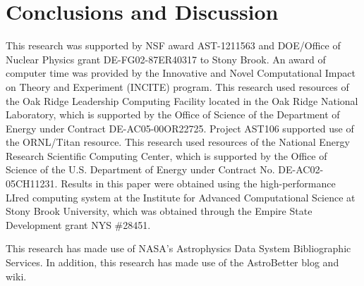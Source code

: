 \documentclass[twocolumn,numberedappendix]{../aastex6}
\begin{document}



\section{Conclusions and Discussion}\label{Sec:Conclusions and Discussion}
\label{sec:conclusion}



\acknowledgments

This research was supported by NSF award AST-1211563 and DOE/Office of
Nuclear Physics grant DE-FG02-87ER40317 to Stony Brook. An award of
computer time was provided by the Innovative and Novel Computational
Impact on Theory and Experiment (INCITE) program.  This research used
resources of the Oak Ridge Leadership Computing Facility located in
the Oak Ridge National Laboratory, which is supported by the Office of
Science of the Department of Energy under Contract
DE-AC05-00OR22725. Project AST106 supported use of the ORNL/Titan
resource.  This research used resources of the National Energy
Research Scientific Computing Center, which is supported by the Office
of Science of the U.S. Department of Energy under Contract
No. DE-AC02-05CH11231.  Results in this paper were obtained using the
high-performance LIred computing system at the Institute for Advanced
Computational Science at Stony Brook University, which was obtained
through the Empire State Development grant NYS \#28451.

This research has made use of NASA's Astrophysics Data System 
Bibliographic Services. In addition, this research has made use
of the AstroBetter blog and wiki.

\clearpage



\end{document}
